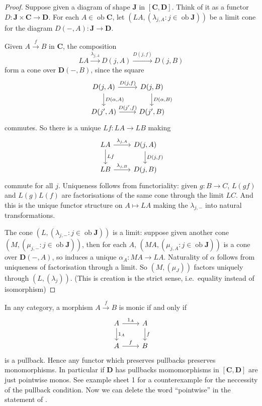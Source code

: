 \documentclass[a4paper]{article}
\renewcommand{\c}[1]{\mathbf{#1}}
\DeclareMathOperator{\ob}{ob}
\begin{document}
\begin{proof}
  Suppose given a diagram of shape \(\c J\) in \([\c C, \c D]\). Think of it as a functor \(D: \c J \times \c C \to \c D\). For each \(A \in \ob \c C\), let \((LA, (\lambda_{j, A}: j \in \ob \c J))\) be a limit cone for the diagram \(D(-, A): \c J \to \c D\).

  Given \(A \xrightarrow{f} B\) in \(\c C\), the composition
  \[
    LA \xrightarrow{\lambda_{j, A}} D(j, A) \xrightarrow{D(j, f)} D(j, B)
  \]
  form a cone over \(\c D(-, B)\), since the square
  \[
    \begin{tikzcd}
      D(j, A) \ar[r, "{D(j, f)}"] \ar[d, "{D(\alpha, A)}"] & D(j, B) \ar[d, "{D(\alpha, B)}"] \\
      D(j', A) \ar[r, "{D(j', f)}"] & D(j', B)
    \end{tikzcd}
  \]
  commutes. So there is a unique \(Lf: LA \to LB\) making
  \[
    \begin{tikzcd}
      LA \ar[r, "{\lambda_{j, A}}"] \ar[d, "Lf"] & {D(j, A)} \ar[d, "{D(j, f)}"] \\
      LB \ar[r, "{\lambda_{j, B}}"] & D(j, B)
    \end{tikzcd}
  \]
  commute for all \(j\). Uniqueness follows from functoriality: given \(g: B \to C\), \(L(gf)\) and \(L(g)L(f)\) are factorisations of the same cone through the limit \(LC\). And this is the unique functor structure on \(A \mapsto LA\) making the \(\lambda_{j, -}\) into natural transformations.

  The cone \((L, (\lambda_{j, -}: j \in \ob \c J))\) is a limit: suppose given another cone \((M, (\mu_{j, -}: j \in \ob \c J))\), then for each \(A\), \((MA, (\mu_{j, A}: j \in \ob \c J))\) is a cone over \(\c D(-, A)\), so induces a unique \(\alpha_A: MA \to LA\). Naturality of \(\alpha\) follows from uniqueness of factorisation through a limit. So \((M, (\mu_J))\) factors uniquely through \((L, (\lambda_j))\). (This is creation is the strict sense, i.e.\ equality instead of isomorphism)
\end{proof}

\begin{remark}
  In any category, a morphism \(A \xrightarrow{f} B\) is monic if and only if
  \[
    \begin{tikzcd}
      A \ar[r, "1_A"] \ar[d, "1_A"] & A \ar[d, "f"] \\
      A \ar[r, "f"] & B
    \end{tikzcd}
  \]
  is a pullback. Hence any functor which preserves pullbacks preserves monomorphisms. In particular if \(\c D\) has pullbacks momomorphisms in \([\c C, \c D]\) are just pointwise monos. See example sheet 1 for a counterexample for the neccessity of the pullback condition. Now we can delete the word ``pointwise'' in the statement of .
\end{remark}
\end{document}
